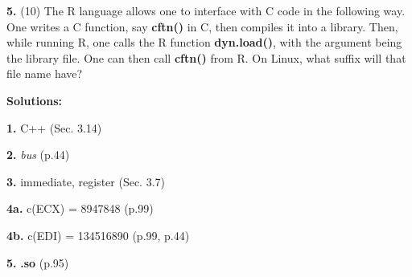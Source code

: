 \documentclass[twocolumn]{article}
\begin{document}
{\bf 5.} (10) The R language allows one to interface with C code in the
following way.  One writes a C function, say {\bf cftn()} in C, then
compiles it into a library.  Then, while running R, one calls the R
function {\bf dyn.load()}, with the argument being the library file.
One can then call {\bf cftn()} from R.  On Linux, what suffix will that
file name have?

{\bf Solutions:}

{\bf 1.}  C++ (Sec. 3.14)

{\bf 2.} {\it bus} (p.44)

{\bf 3.} immediate, register (Sec. 3.7)

{\bf 4a.} c(ECX) = 8947848 (p.99)

{\bf 4b.} c(EDI) = 134516890 (p.99, p.44)

{\bf 5.} {\bf .so} (p.95)
\end{document}
